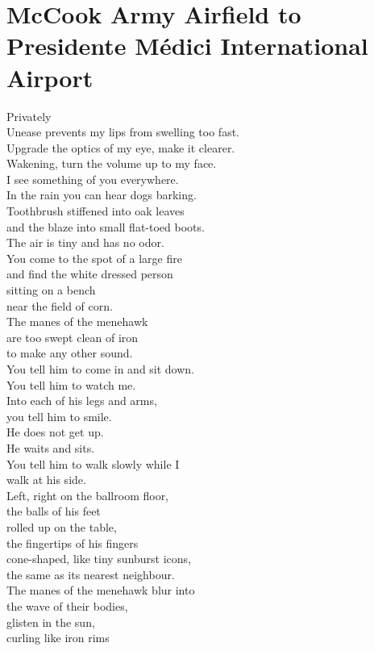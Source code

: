 \documentclass[smalldemyvopaper,11pt,twoside,onecolumn,openright,extrafontsizes]{memoir}
\begin{document}
\chapter{McCook Army Airfield to Presidente Médici International Airport}
Privately
\\Unease prevents my lips from swelling too fast.
\\Upgrade the optics of my eye, make it clearer.
\\Wakening, turn the volume up to my face.
\\I see something of you everywhere.
\\In the rain you can hear dogs barking.
\\Toothbrush stiffened into oak leaves
\\and the blaze into small flat-toed boots.
\\The air is tiny and has no odor.
\\You come to the spot of a large fire
\\and find the white dressed person
\\sitting on a bench
\\near the field of corn.
\\The manes of the menehawk
\\are too swept clean of iron
\\to make any other sound.
\\You tell him to come in and sit down.
\\You tell him to watch me.
\\Into each of his legs and arms,
\\you tell him to smile.
\\He does not get up.
\\He waits and sits.
\\You tell him to walk slowly while I
\\walk at his side.
\\Left, right on the ballroom floor,
\\the balls of his feet
\\rolled up on the table,
\\the fingertips of his fingers
\\cone-shaped, like tiny sunburst icons,
\\the same as its nearest neighbour.
\\The manes of the menehawk blur into
\\the wave of their bodies,
\\glisten in the sun,
\\curling like iron rims
\end{document}

